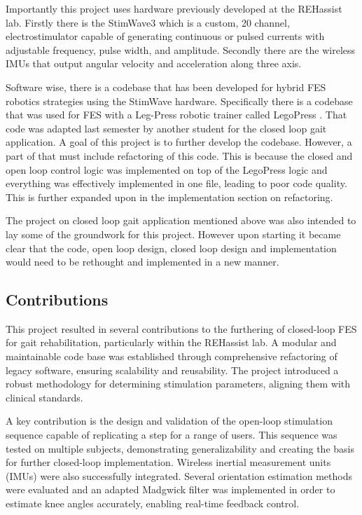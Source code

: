 Importantly this project uses hardware previously developed at the REHassist lab. Firstly there is the StimWave3 which is a custom, 20 channel, electrostimulator capable of generating continuous or pulsed currents with adjustable frequency, pulse width, and amplitude. Secondly there are the wireless IMUs that output angular velocity and acceleration along three axis. 

Software wise, there is a codebase that has been developed for hybrid FES robotics strategies using the StimWave hardware. Specifically there is a codebase that was used for FES with a Leg-Press robotic trainer called LegoPress \cite{olivier_legopress_2014}. That code was adapted last semester by another student for the closed loop gait application. A goal of this project is to further develop the codebase. However, a part of that must include refactoring of this code. This is because the closed and open loop control logic was implemented on top of the LegoPress logic and everything was effectively implemented in one file, leading to poor code quality. This is further expanded upon in the implementation section on refactoring.

The project on closed loop gait application mentioned above was also intended to lay some of the groundwork for this project. However upon starting it became clear that the code, open loop design, closed loop design and implementation would need to be rethought and implemented in a new manner.



\subsection{Contributions}
This project resulted in several contributions to the furthering of closed-loop FES for gait rehabilitation, particularly within the REHassist lab. A modular and maintainable code base was established through comprehensive refactoring of legacy software, ensuring scalability and reusability. The project introduced a robust methodology for determining stimulation parameters, aligning them with clinical standards.

A key contribution is the design and validation of the open-loop stimulation sequence capable of replicating a step for a range of users. This sequence was tested on multiple subjects, demonstrating generalizability and creating the basis for further closed-loop implementation. Wireless inertial measurement units (IMUs) were also successfully integrated. Several orientation estimation methods were evaluated and an adapted Madgwick filter was implemented in order to estimate knee angles accurately, enabling real-time feedback control.

